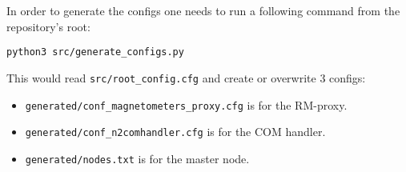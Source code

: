 In order to generate the configs one needs to run a following command from the repository's root:
\begin{verbatim}
python3 src/generate_configs.py
\end{verbatim}
This would read \texttt{src/root\_config.cfg} and create or overwrite 3 configs:

\begin{itemize}
	\item \texttt{generated/conf\_magnetometers\_proxy.cfg} is for the RM-proxy.
	\item \texttt{generated/conf\_n2comhandler.cfg} is for the COM handler.
	\item \texttt{generated/nodes.txt} is for the master node.
\end{itemize}



